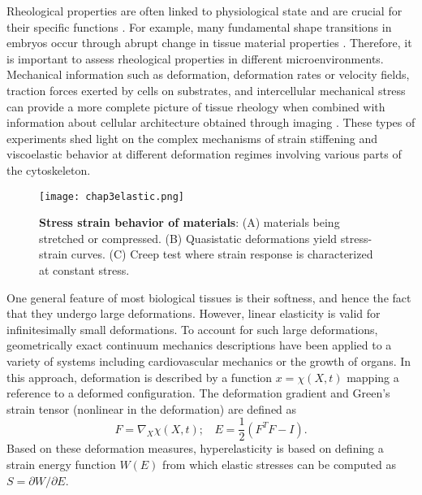 Rheological properties are often linked to physiological state and are crucial for their specific functions \cite{park2015, vedula2012}. For example, many fundamental shape transitions in embryos occur through abrupt change in tissue material properties \cite{hannezo2022}. Therefore, it is important to assess rheological properties in different microenvironments. Mechanical information such as deformation, deformation rates or velocity fields, traction forces exerted by cells on substrates, and intercellular mechanical stress can provide a more complete picture of tissue rheology when combined with information about cellular architecture obtained through imaging \cite{roca-cusachs2017}. These types of experiments shed light on the complex mechanisms of strain stiffening and viscoelastic behavior at different deformation regimes involving various parts of the cytoskeleton.

\begin{figure}
	\centering
	\texttt{[image: chap3elastic.png]}
	\caption{\label{fig_3_8} \textbf{Stress strain behavior of materials}: (A) materials being stretched or compressed. (B) Quasistatic deformations yield stress-strain curves. (C) Creep test where strain response is characterized at constant stress.
	}
\end{figure}

One general feature of most biological tissues is their softness, and hence the fact that they undergo large deformations. However, linear elasticity is valid for infinitesimally small deformations. To account for such large deformations, geometrically exact continuum mechanics descriptions have been applied to a variety of systems including cardiovascular mechanics or the growth of organs. In this approach, deformation is described by a function  \(x = \chi (X, t)\) mapping a reference to a deformed configuration. The deformation gradient and Green's strain tensor (nonlinear in the deformation) are defined as
$$ F = \nabla_X \chi(X, t);\ \ \ \ E = \frac{1}{2}(F^T F - I). $$ 
Based on these deformation measures, hyperelasticity is based on defining a strain energy function $W(E)$ from which elastic stresses can be computed as $S = {\partial W}/{\partial E}$. 



